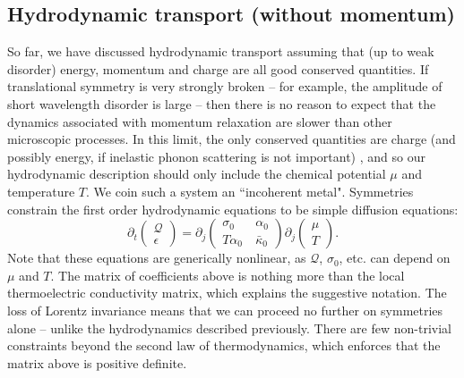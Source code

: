 \documentclass[10pt, oneside]{book}
\begin{document}
\begin{doublespace}
\subsection{Hydrodynamic transport (without momentum)}
So far, we have discussed hydrodynamic transport assuming that (up to weak disorder) energy, momentum and charge are all good conserved quantities.   If translational symmetry is very strongly broken -- for example, the amplitude of short wavelength disorder is large -- then there is no reason to expect that the dynamics associated with momentum relaxation are slower than other microscopic processes.   In this limit, the only conserved quantities are charge (and possibly energy, if inelastic phonon scattering is not important) \cite{Hartnoll:2014lpa},  and so our hydrodynamic description should only include the chemical potential $\mu$ and temperature $T$.   We coin such a system an ``incoherent metal".   Symmetries constrain the first order hydrodynamic equations to be simple diffusion equations: \begin{equation}
\partial_t \left(\begin{array}{c} \mathcal{Q} \\ \epsilon \end{array}\right) = \partial_j \left(\begin{array}{cc} \sigma_0 &\ \alpha_0 \\ T\alpha_0 &\ \bar\kappa_0 \end{array}\right)   \partial_j  \left(\begin{array}{c} \mu  \\ T \end{array}\right).  \label{eq:diffthermo}
\end{equation}
Note that these equations are generically nonlinear, as $\mathcal{Q}$, $\sigma_0$, etc. can depend on $\mu$ and $T$.  The matrix of coefficients above is nothing more than the local thermoelectric conductivity matrix, which explains the suggestive notation.  The loss of Lorentz invariance means that we can proceed no further on symmetries alone -- unlike the hydrodynamics described previously.  There are few non-trivial constraints beyond the second law of thermodynamics, which enforces that the matrix above is positive definite.   


\end{doublespace}
\end{document}
